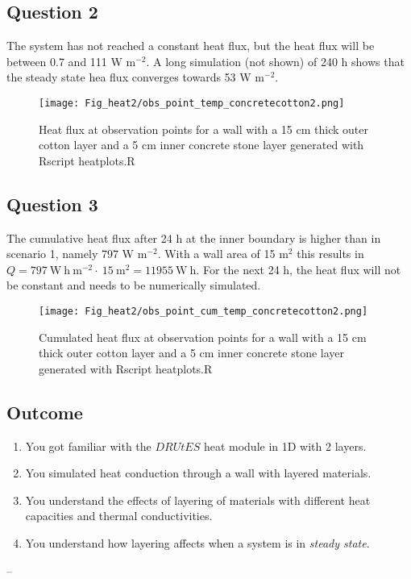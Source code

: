 \subsection*{Question 2}

The system has not reached a constant heat flux, but the heat flux will be between 0.7 and 111 W m$^{-2}$. A long simulation (not shown) of 240 h shows that the steady state hea flux converges towards 53 W m$^{-2}$.

\begin{figure}[!h]
\centering
\texttt{[image: Fig\_heat2/obs\_point\_temp\_concretecotton2.png]}
\caption{\label{plot5} Heat flux at observation points for a wall with a 15 cm thick outer cotton layer and a 5 cm inner concrete stone layer generated with Rscript heatplots.R}
\end{figure}


\subsection*{Question 3}

The cumulative heat flux after 24 h at the inner boundary is higher than in scenario 1, namely 797 W m$^{-2}$. With a wall area of 15 m$^2$ this results in $Q = 797~\mathrm{W~h~m^{-2}}\cdot~15~\mathrm{m^{2}}= 11955 ~\mathrm{W~h}$. 
For the next 24 h, the heat flux will not be constant and needs to be numerically simulated. 

\begin{figure}[!h]
\centering
\texttt{[image: Fig\_heat2/obs\_point\_cum\_temp\_concretecotton2.png]}
\caption{\label{plot6} Cumulated heat flux at observation points for a wall with a 15 cm thick outer cotton layer and a 5 cm inner concrete stone layer generated with Rscript heatplots.R}
\end{figure}

\newpage
\newpage
\newpage

\subsection{Outcome}
\begin{enumerate}
\item You got familiar with the $DRUtES$ heat module in 1D with 2 layers.
\item You simulated heat conduction through a wall with layered materials.
\item You understand the effects of layering of materials with different heat capacities and thermal conductivities.
\item You understand how layering affects when a system is in \emph{steady state}.
\end{enumerate}
--